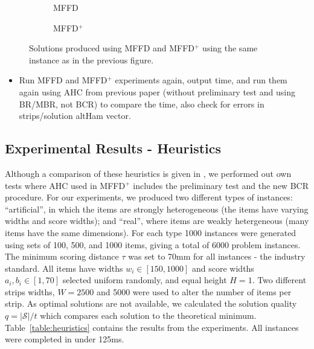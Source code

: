 \documentclass{elsarticle}
\begin{document}
\begin{figure}[H]	
	\centering
	\begin{subfigure}[h]{0.45\textwidth}
		
		\caption{MFFD}
		\label{fig:mffd}
	\end{subfigure} \hspace{10mm}
	\begin{subfigure}[h]{0.45\textwidth}
		
		\caption{MFFD$^+$}
		\label{fig:mffdplus}
	\end{subfigure}
	\caption{Solutions produced using MFFD and MFFD$^+$ using the same instance as in the previous figure. }
	\label{fig:mffdvsmffdplus}
\end{figure}

{\color{myPink}
\begin{itemize}[leftmargin=*]
	\item Run MFFD and MFFD$^+$ experiments again, output time, and run them again using AHC from previous paper (without preliminary test and using BR/MBR, not BCR) to compare the time, also check for errors in strips/solution altHam vector.
\end{itemize}
}

\subsection{Experimental Results - Heuristics}
\label{sub:expheuristics}
\noindent Although a comparison of these heuristics is given in \cite{hawa2018}, we performed out own tests where AHC used in MFFD$^+$ includes the preliminary test and the new BCR procedure. For our experiments, we produced two different types of instances: ``artificial'', in which the items are strongly heterogeneous (the items have varying widths and score widths); and ``real'', where items are weakly hetergeneous (many items have the same dimensions). For each type 1000 instances were generated using sets of 100, 500, and 1000 items, giving a total of 6000 problem instances. The minimum scoring distance $\tau$ was set to 70mm for all instances - the industry standard. All items have widths $w_i \in [150,1000]$ and score widths $a_i, b_i \in [1,70]$ selected uniform randomly, and equal height $H=1$. Two different strips widths, $W = 2500$ and 5000 were used to alter the number of items per strip. As optimal solutions are not available, we calculated the solution quality $q = |\mathcal{S}|/ t$ which compares each solution to the theoretical minimum. Table~\ref{table:heuristics} contains the results from the experiments. All instances were completed in under 125ms.
\end{document}
